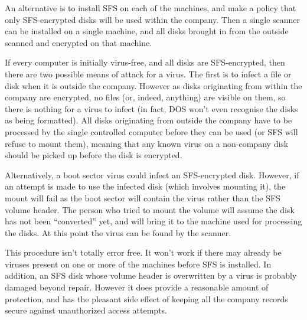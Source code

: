 An alternative is to install SFS on each of the machines, and make a policy
that only SFS-encrypted disks will be used within the company.  Then a single
scanner can be installed on a single machine, and all disks brought in from the
outside scanned and encrypted on that machine.

If every computer is initially virus-free, and all disks are SFS-encrypted,
then there are two possible means of attack for a virus.  The first is to
infect a file or disk when it is outside the company.  However as disks
originating from within the company are encrypted, no files (or, indeed,
anything) are visible on them, so there is nothing for a virus to infect (in
fact, DOS won't even recognise the disks as being formatted).  All disks
originating from outside the company have to be processed by the single
controlled computer before they can be used (or SFS will refuse to mount them), 
meaning that any known virus on a non-company disk should be picked up before 
the disk is encrypted.

Alternatively, a boot sector virus could infect an SFS-encrypted disk.
However, if an attempt is made to use the infected disk (which involves
mounting it), the mount will fail as the boot sector will contain the virus
rather than the SFS volume header.  The person who tried to mount the volume
will assume the disk has not been ``converted'' yet, and will bring it to the
machine used for processing the disks.  At this point the virus can be found by
the scanner.

This procedure isn't totally error free.  It won't work if there may already be
viruses present on one or more of the machines before SFS is installed.  In
addition, an SFS disk whose volume header is overwritten by a virus is probably
damaged beyond repair.  However it does provide a reasonable amount of
protection, and has the pleasant side effect of keeping all the company records
secure against unauthorized access attempts.




